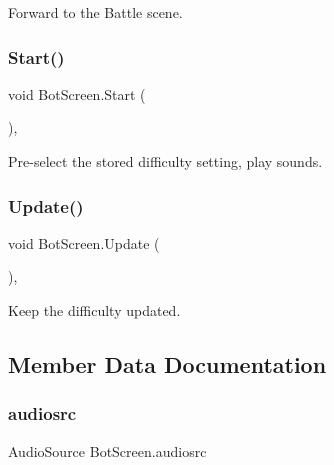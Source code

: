 Forward to the Battle scene. 

\mbox{\label{class_bot_screen_a3ffff8c4a3c08bfc13dde5e3a7af702f}} 
\subsubsection{\texorpdfstring{Start()}{Start()}}
{\footnotesize\ttfamily void Bot\+Screen.\+Start (\begin{DoxyParamCaption}{ }\end{DoxyParamCaption})\hspace{0.3cm}{\ttfamily [inline]}, {\ttfamily [private]}}



Pre-\/select the stored difficulty setting, play sounds. 

\mbox{\label{class_bot_screen_a4a3fe27c63d7539549cd01b2f7176ed5}} 
\subsubsection{\texorpdfstring{Update()}{Update()}}
{\footnotesize\ttfamily void Bot\+Screen.\+Update (\begin{DoxyParamCaption}{ }\end{DoxyParamCaption})\hspace{0.3cm}{\ttfamily [inline]}, {\ttfamily [private]}}



Keep the difficulty updated. 



\subsection{Member Data Documentation}
\mbox{\label{class_bot_screen_ad005dc3b790b271432c1a7146acd1057}} 
\subsubsection{\texorpdfstring{audiosrc}{audiosrc}}
{\footnotesize\ttfamily Audio\+Source Bot\+Screen.\+audiosrc}

